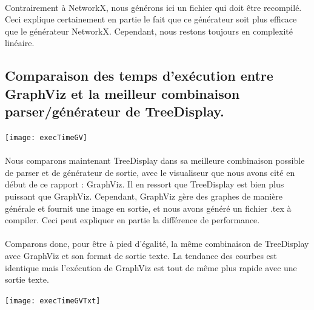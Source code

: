 \paragraph{} Contrairement à NetworkX, nous générons ici un fichier qui doit être recompilé. Ceci explique certainement en partie le fait que ce générateur soit plus efficace que le générateur NetworkX. Cependant, nous restons toujours en complexité linéaire.

	\subsection{Comparaison des temps d'exécution entre GraphViz et la meilleur combinaison parser/générateur de TreeDisplay.}
	
\begin{center}

\texttt{[image: execTimeGV]}

\end{center}

\paragraph{} Nous comparons maintenant TreeDisplay dans sa meilleure combinaison possible de parser et de générateur de sortie, avec le visualiseur que nous avons cité en début de ce rapport : GraphViz. Il en ressort que TreeDisplay est bien plus puissant que GraphViz. Cependant, GraphViz gère des graphes de manière générale et fournit une image en sortie, et nous avons généré un fichier .tex à compiler. Ceci peut expliquer en partie la différence de performance.

\paragraph{} Comparons donc, pour être à pied d'égalité, la même combinaison de TreeDisplay avec GraphViz et son format de sortie texte. La tendance des courbes est identique mais l'exécution de GraphViz est tout de même plus rapide avec une sortie texte.

\begin{center}
\texttt{[image: execTimeGVTxt]}
\end{center}